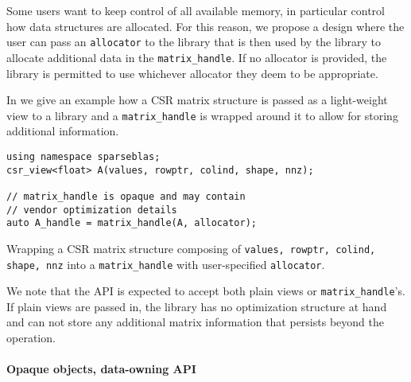 \documentclass{article}
\begin{document}
Some users want to keep control of all available memory, in particular control how data structures are allocated. For this reason, we propose a design where the user can pass an \texttt{allocator} to the library that is then used by the library to allocate additional data in the \texttt{matrix\_handle}. If no allocator is provided, the library is permitted to use whichever allocator they deem to be appropriate.

In  we give an example how a CSR matrix structure is passed as a light-weight view to a library and a \texttt{matrix\_handle} is wrapped around it to allow for storing additional information.


\begin{listing}[H]
\begin{verbatim}
using namespace sparseblas;
csr_view<float> A(values, rowptr, colind, shape, nnz);

// matrix_handle is opaque and may contain 
// vendor optimization details
auto A_handle = matrix_handle(A, allocator);
\end{verbatim}
\label{fig:csrmatrixhandle}
\caption{Wrapping a CSR matrix structure composing of \texttt{values, rowptr, colind, shape, nnz} into a \texttt{matrix\_handle} with user-specified \texttt{allocator}.}
\end{listing}

We note that the API is expected to accept both plain views or \texttt{matrix\_handle}'s. If plain views are passed in, the library has no optimization structure at hand and can not store any additional matrix information that persists beyond the operation.







\iffalse







\paragraph{Opaque objects, data-owning API}
\end{document}

